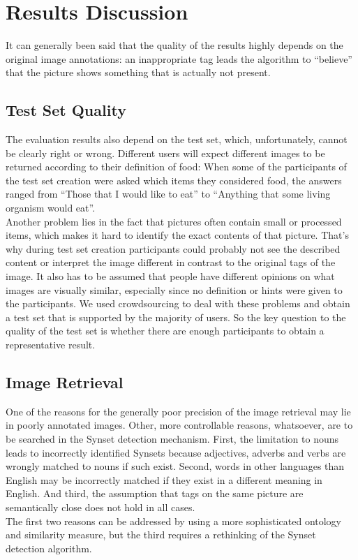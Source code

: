 %
\section{Results Discussion}
\label{sec_discussion}

It can generally been said that the quality of the results highly depends on the original image annotations: an inappropriate tag leads the algorithm to ``believe'' that the picture shows something that is actually not present.

\subsection{Test Set Quality}
The evaluation results also depend on the test set, which, unfortunately, cannot be clearly right or wrong. Different users will expect different images to be returned according to their definition of food: When some of the participants of the test set creation were asked which items they considered food, the answers ranged from ``Those that I would like to eat'' to ``Anything that some living organism would eat''. \\
Another problem lies in the fact that pictures often contain small or processed items, which makes it hard to identify the exact contents of that picture. That's why during test set creation participants could probably not see the described content or interpret the image different in contrast to the original tags of the image. 
It also has to be assumed that people have different opinions on what images are visually similar, especially since no definition or hints were given to the participants. We used crowdsourcing to deal with these problems and obtain a test set that is supported by the majority of users. So the key question to the quality of the test set is whether there are enough participants to obtain a representative result.

\subsection{Image Retrieval}
One of the reasons for the generally poor precision of the image retrieval may lie in poorly annotated images.
Other, more controllable reasons, whatsoever, are to be searched in the Synset detection mechanism. First, the limitation to nouns leads to incorrectly identified Synsets because adjectives, adverbs and verbs are wrongly matched to nouns if such exist. 
Second, words in other languages than English may be incorrectly matched if they exist in a different meaning in English.
And third, the assumption that tags on the same picture are semantically close does not hold in all cases. \\
The first two reasons can be addressed by using a more sophisticated ontology and similarity measure, but the third requires a rethinking of the Synset detection algorithm.

